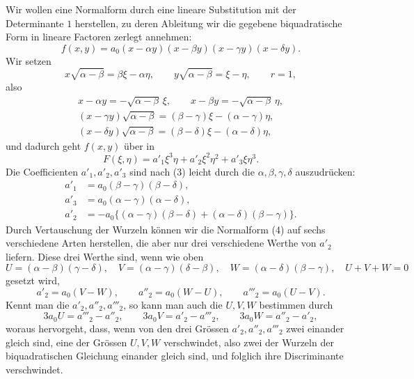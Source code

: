 \documentclass[11pt]{article}
\begin{document}
Wir wollen eine Normalform durch eine lineare Substitution mit der Determinante $1$ herstellen, zu deren Ableitung wir die gegebene biquadratische Form in lineare Factoren zerlegt annehmen:
\begin{equation}
 f(x,y)=a_0(x-\alpha y)(x-\beta y)(x-\gamma y)(x-\delta y).
\tag{1}
\end{equation}
Wir setzen
\begin{equation}
 x\sqrt{\alpha-\beta}=\beta\xi-\alpha\eta,
 \qquad
 y\sqrt{\alpha-\beta}=\xi-\eta,
 \qquad r=1,
\tag{2}
\end{equation}
also
\begin{equation}
\begin{gathered}
 x-\alpha y=-\sqrt{\alpha-\beta}\,\xi,
 \qquad
 x-\beta y=-\sqrt{\alpha-\beta}\,\eta,\\
 (x-\gamma y)\sqrt{\alpha-\beta}=(\beta-\gamma)\xi-(\alpha-\gamma)\eta,\\
 (x-\delta y)\sqrt{\alpha-\beta}=(\beta-\delta)\xi-(\alpha-\delta)\eta,
\end{gathered}
\tag{3}
\end{equation}
und dadurch geht $f(x,y)$ über in
\begin{equation}
 F(\xi,\eta)=a'_1\xi^3\eta+a'_2\xi^2\eta^2+a'_3\xi\eta^3.
\tag{4}
\end{equation}
Die Coefficienten $a'_1,a'_2,a'_3$ sind nach (3) leicht durch die $\alpha,\beta,\gamma,\delta$ auszudrücken:
\begin{equation}
\begin{aligned}
 a'_1&=a_0(\beta-\gamma)(\beta-\delta),\\
 a'_3&=a_0(\alpha-\gamma)(\alpha-\delta),\\
 a'_2&=-a_0\{(\alpha-\gamma)(\beta-\delta)+(\alpha-\delta)(\beta-\gamma)\}.
\end{aligned}
\tag{5}
\end{equation}
Durch Vertauschung der Wurzeln können wir die Normalform (4) auf sechs verschiedene Arten herstellen, die aber nur drei verschiedene Werthe von $a'_2$ liefern. Diese drei Werthe sind, wenn wie oben
\begin{equation}
 U=(\alpha-\beta)(\gamma-\delta),
 \quad
 V=(\alpha-\gamma)(\delta-\beta),
 \quad
 W=(\alpha-\delta)(\beta-\gamma),
 \quad
 U+V+W=0
\tag{6}
\end{equation}
gesetzt wird,
\begin{equation}
 a'_2=a_0(V-W),
 \qquad
 a''_2=a_0(W-U),
 \qquad
 a'''_2=a_0(U-V).
\tag{7}
\end{equation}
Kennt man die $a'_2,a''_2,a'''_2$, so kann man auch die $U,V,W$ bestimmen durch
\begin{equation}
 3a_0U=a'''_2-a''_2,
 \qquad
 3a_0V=a'_2-a'''_2,
 \qquad
 3a_0W=a''_2-a'_2,
\tag{8}
\end{equation}
woraus hervorgeht, dass, wenn von den drei Grössen $a'_2,a''_2,a'''_2$ zwei einander gleich sind, eine der Grössen $U,V,W$ verschwindet, also zwei der Wurzeln der biquadratischen Gleichung einander gleich sind, und folglich ihre Discriminante verschwindet.
\end{document}

